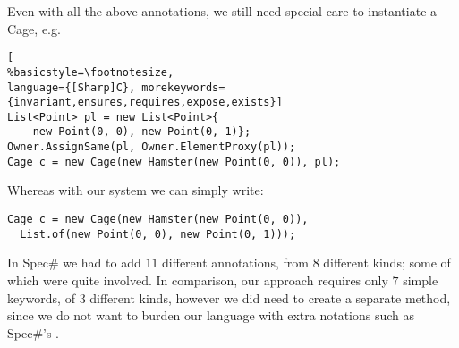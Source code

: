 \noindent Even with all the above annotations, we still need special care to instantiate a Cage, e.g.
\begin{lstlisting}[
%basicstyle=\footnotesize,
language={[Sharp]C}, morekeywords={invariant,ensures,requires,expose,exists}]
List<Point> pl = new List<Point>{
	new Point(0, 0), new Point(0, 1)};
Owner.AssignSame(pl, Owner.ElementProxy(pl));
Cage c = new Cage(new Hamster(new Point(0, 0)), pl);
\end{lstlisting}
Whereas with our system we can simply write:
\begin{lstlisting}
Cage c = new Cage(new Hamster(new Point(0, 0)),
  List.of(new Point(0, 0), new Point(0, 1)));
\end{lstlisting}

In Spec\# we had to add $11$ different annotations, from $8$ different kinds; some of which were quite involved. In comparison, our approach requires only $7$ simple keywords, of $3$ different kinds, however we did need to create a separate \Q@moveTo@ method, since we do not want to burden our language with extra notations such as Spec\#'s \Q@expose@.

